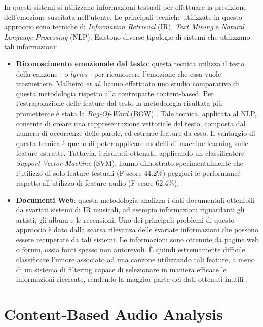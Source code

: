 \documentclass[11pt]{report}
\begin{document}
In questi sistemi si utilizzano informazioni testuali per effettuare la predizione dell'emozione suscitata nell'utente. Le principali tecniche utilizzate in questo approccio sono tecniche di \textit{Information Retrieval} (IR), \textit{Text Mining} e \textit{Natural Language Processing} (NLP). Esistono diverse tipologie di sistemi che utilizzano tali informazioni:
\begin{itemize}
    \item \textbf{Riconoscimento emozionale dal testo}:
    questa tecnica utilizza il testo della canzone - o \textit{lyrics} - per riconoscere l'emozione che essa vuole trasmettere. Malheiro \textit{et al.} \cite{lyrics} hanno effettuato uno studio comparativo di questa metodologia rispetto alla controparte content-based. Per l'estrapolazione delle feature dal testo la metodologia risultata più promettente è stata la \textit{Bag-Of-Word} (BOW) \cite{sebastiani2002machine}. Tale tecnica, applicata al NLP, consente di creare una rappresentazione vettoriale del testo, composta dal numero di occorrenze delle parole, ed estrarre feature da esso. Il vantaggio di questa tecnica è quello di poter applicare modelli di machine learning sulle feature estratte. Tuttavia, i risultati ottenuti, applicando un classificatore \textit{Support Vector Machine} (SVM), hanno dimostrato sperimentalmente che l'utilizzo di solo feature testuali (F-score 44.2\%) peggiori le performance rispetto all'utilizzo di feature audio (F-score 62.4\%).

    
    \item \textbf{Documenti Web}: questa metodologia analizza i dati documentali ottenibili da svariati sistemi di IR musicali, ad esempio informazioni riguardanti gli artisti, gli album e le recensioni. Uno dei principali problemi di questo approccio è dato dalla scarsa rilevanza delle svariate informazioni che possono essere recuperate da tali sistemi. Le informazioni sono ottenute da pagine web o forum, ossia fonti spesso non autorevoli. È quindi estremamente difficile classificare l'umore associato ad una canzone utilizzando tali feature, a meno di un sistema di filtering capace di selezionare in maniera efficace le informazioni ricercate, rendendo la maggior parte dei dati ottenuti inutili \cite{levy2007semantic}.
    
    
\end{itemize}



\section{Content-Based Audio Analysis}
\end{document}
